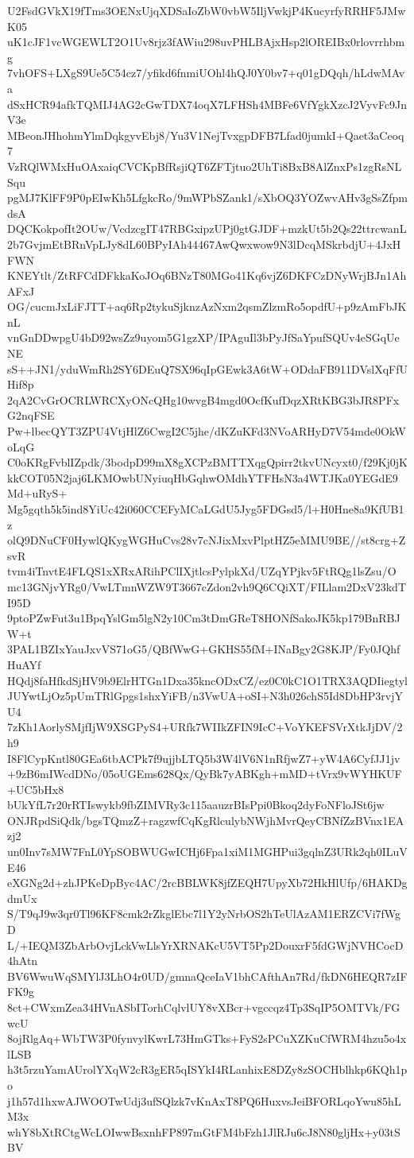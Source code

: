 U2FsdGVkX19fTms3OENxUjqXDSaIoZbW0vbW5IljVwkjP4KucyrfyRRHF5JMwK05
uK1cJF1vcWGEWLT2O1Uv8rjz3fAWiu298uvPHLBAjxHsp2lOREIBx0rlovrrhbmg
7vhOFS+LXgS9Ue5C54cz7/yfikd6fnmiUOhl4hQJ0Y0bv7+q01gDQqh/hLdwMAva
dSxHCR94afkTQMIJ4AG2cGwTDX74oqX7LFHSh4MBFe6VfYgkXzcJ2VyvFc9JnV3e
MBeonJHhohmYlmDqkgyvEbj8/Yu3V1NejTvxgpDFB7Lfad0jumkI+Qaet3aCeoq7
VzRQlWMxHuOAxaiqCVCKpBfRsjiQT6ZFTjtuo2UhTi8BxB8AlZnxPs1zgRsNLSqu
pgMJ7KlFF9P0pEIwKh5LfgkcRo/9mWPbSZank1/sXbOQ3YOZwvAHv3gSsZfpmdsA
DQCKokpofIt2OUw/VcdzcgIT47RBGxipzUPj0gtGJDF+mzkUt5b2Qs22ttrcwanL
2b7GvjmEtBRnVpLJy8dL60BPyIAh44467AwQwxwow9N3lDcqMSkrbdjU+4JxHFWN
KNEYtlt/ZtRFCdDFkkaKoJOq6BNzT80MGo41Kq6vjZ6DKFCzDNyWrjBJn1AhAFxJ
OG/cucmJxLiFJTT+aq6Rp2tykuSjknzAzNxm2qsmZlzmRo5opdfU+p9zAmFbJKnL
vnGnDDwpgU4bD92wsZz9uyom5G1gzXP/IPAguIl3bPyJfSaYpufSQUv4eSGqUeNE
sS++JN1/yduWmRh2SY6DEuQ7SX96qIpGEwk3A6tW+ODdaFB911DVslXqFfUHif8p
2qA2CvGrOCRLWRCXyONcQHg10wvgB4mgd0OcfKufDqzXRtKBG3bJR8PFxG2nqFSE
Pw+lbecQYT3ZPU4VtjHlZ6CwgI2C5jhe/dKZuKFd3NVoARHyD7V54mde0OkWoLqG
C0oKRgFvblIZpdk/3bodpD99mX8gXCPzBMTTXqgQpirr2tkvUNcyxt0/f29Kj0jK
kkCOT05N2jaj6LKMOwbUNyiuqHbGqhwOMdhYTFHsN3a4WTJKa0YEGdE9Md+uRyS+
Mg5gqth5k5ind8YiUc42i060CCEFyMCaLGdU5Jyg5FDGsd5/l+H0Hne8a9KfUB1z
olQ9DNuCF0HywlQKygWGHuCvs28v7cNJixMxvPlptHZ5eMMU9BE//st8crg+ZsvR
tvm4iTnvtE4FLQS1xXRxARihPClIXjtlcsPylpkXd/UZqYPjkv5FtRQg1lsZsu/O
mc13GNjvYRg0/VwLTmnWZW9T3667cZdon2vh9Q6CQiXT/FILlam2DxV23kdTI95D
9ptoPZwFut3u1BpqYslGm5lgN2y10Cm3tDmGReT8HONfSakoJK5kp179BnRBJW+t
3PAL1BZIxYauJxvVS71oG5/QBfWwG+GKHS55fM+INaBgy2G8KJP/Fy0JQhfHuAYf
HQdj8faHfkdSjHV9b9ElrHTGn1Dxa35kncODxCZ/ez0C0kC1O1TRX3AQDIiegtyl
JUYwtLjOz5pUmTRlGpgs1shxYiFB/n3VwUA+oSI+N3h026chS5Id8DbHP3rvjYU4
7zKh1AorlySMjfIjW9XSGPyS4+URfk7WIIkZFIN9IcC+VoYKEFSVrXtkJjDV/2h9
I8FlCypKntl80GEa6tbACPk7f9ujjbLTQ5b3W4lV6N1nRfjwZ7+yW4A6CyfJJ1jv
+9zB6mIWcdDNo/05oUGEms628Qx/QyBk7yABKgh+mMD+tVrx9vWYHKUF+UC5bHx8
bUkYfL7r20rRTIswykb9fbZIMVRy3c115aauzrBIsPpi0Bkoq2dyFoNFloJSt6jw
ONJRpdSiQdk/bgsTQmzZ+ragzwfCqKgRlculybNWjhMvrQeyCBNfZzBVnx1EAzj2
un0Inv7sMW7FnL0YpSOBWUGwICHj6Fpa1xiM1MGHPui3gqlnZ3URk2qh0ILuVE46
eXGNg2d+zhJPKeDpByc4AC/2rcBBLWK8jfZEQH7UpyXb72HkHlUfp/6HAKDgdmUx
S/T9qJ9w3qr0Tl96KF8cmk2rZkglEbc7l1Y2yNrbOS2hTeUlAzAM1ERZCVi7fWgD
L/+IEQM3ZbArbOvjLckVwLlsYrXRNAKcU5VT5Pp2DouxrF5fdGWjNVHCocD4hAtn
BV6WwuWqSMYlJ3LhO4r0UD/gmnaQceIaV1bhCAfthAn7Rd/fkDN6HEQR7zIFFK9g
8ct+CWxmZea34HVnASbITorhCqlvlUY8vXBcr+vgccqz4Tp3SqIP5OMTVk/FGwcU
8ojRlgAq+WbTW3P0fynvylKwrL73HmGTks+FyS2sPCuXZKuCfWRM4hzu5o4xlLSB
h3t5rzuYamAUrolYXqW2cR3gER5qISYkI4RLanhixE8DZy8zSOCHblhkp6KQh1po
j1h57d1hxwAJWOOTwUdj3ufSQlzk7vKnAxT8PQ6HuxvsJeiBFORLqoYwu85hLM3x
whY8bXtRCtgWcLOIwwBsxnhFP897mGtFM4bFzh1JlRJu6cJ8N80gljHx+y03tSBV
